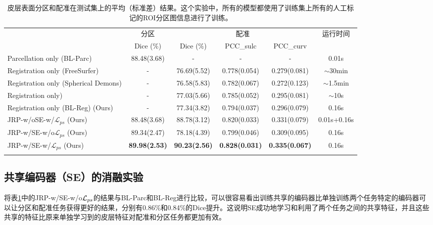 \begin{table}[t]
	\caption{皮层表面分区和配准在测试集上的平均（标准差）结果。这个实验中，所有的模型都使用了训练集上所有的人工标记的ROI分区图信息进行了训练。}\label{tab:同时配准和分区的结果}
	\centering
		\begin{tabular}{lccccc}
			\Xhline{2\arrayrulewidth}
			\multicolumn{1}{l}{\multirow{2}{*}{模型}} & 分区 & \multicolumn{3}{c}{配准}              & \multirow{2}{*}{运行时间} \\ \cline{2-5}
			\multicolumn{1}{c}{}                        & Dice (\%)        & Dice (\%)        & PCC\_sulc        & PCC\_curv       &                           \\ \hline
			Parcellation only (BL-Parc)                & 88.48(3.68)   & -           & -               & -              & 0.01s                     \\ 
			Registration only (FreeSurfer\cite{fischl1999high})        & -            & 76.69(5.52) & 0.778(0.054)  & 0.279(0.081) & $\sim$30min               \\ 
			Registration only (Spherical Demons\cite{yeo2009spherical})  & -            & 76.58(5.83) & 0.782(0.067)  & 0.272(0.123) & $\sim$1.5min              \\ 
			Registration only\cite{zhao2020unsupervised})        & -            & 77.03(5.66) & 0.785(0.052)  & 0.295(0.081) & $\sim$10s                       \\ 
			Registration only (BL-Reg) (Ours)                & -            & 77.34(3.82) & 0.794(0.037) & 0.296(0.079) & 0.16s                     \\ 
			JRP-w/oSE-w/${\mathcal{L}}_{ps}$ (Ours)      & 88.48(3.68)  & 88.78(3.12) & 0.820(0.033)   & 0.331(0.079) &	0.01s+0.16s                     \\ 
			JRP-w/SE-w/o${\mathcal{L}}_{ps}$ (Ours)      &  89.34(2.47) & 78.18(4.39)  & 0.799(0.046)   &	0.309(0.095) &	0.16s                        \\ 
			JRP-w/SE-w/${\mathcal{L}}_{ps}$ (Ours)      &   \textbf{89.98(2.53)} &  \textbf{90.23(2.56)}  & \textbf{0.828(0.031)}   &	\textbf{0.335(0.067)} &	0.16s      \\ 
			\Xhline{2\arrayrulewidth}
		\end{tabular}
\end{table}


\subsection{共享编码器（SE）的消融实验}
将表\ref{tab:同时配准和分区的结果}中的JRP-w/SE-w/o${\cal L}_{ps}$的结果与BL-Parc和BL-Reg进行比较，可以很容易看出训练共享的编码器比单独训练两个任务特定的编码器可以让分区和配准任务获得更好的结果，分别有0.86\%和0.84\%的Dice提升。这说明SE成功地学习和利用了两个任务之间的共享特征，并且这些共享的特征比原来单独学习到的皮层特征对配准和分区任务都更加有效。

